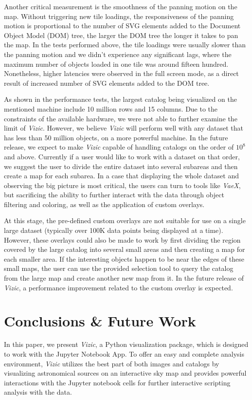 \documentclass[5p,authoryear]{elsarticle}
\begin{document}
Another critical measurement is the smoothness of the panning motion on the map.
Without triggering new tile loadings, the responsiveness of the panning motion is proportional to the number of SVG elements added to the Document Object Model (DOM) tree, the larger the DOM tree the longer it takes to pan the map.
In the tests performed above, the tile loadings were usually slower than the panning motion and we didn't experience any significant lags, where the maximum number of objects loaded in one tile was around fifteen hundred.
Nonetheless, higher latencies were observed in the full screen mode, as a direct result of increased number of SVG elements added to the DOM tree.

As shown in the performance tests, the largest catalog being visualized on the mentioned machine include 10 million rows and 15 columns. Due to the constraints of the available hardware, we were not able to further examine the limit of \textit{Vizic}. However, we believe \textit{Vizic} will perform well with any dataset that has less than 50 million objects, on a more powerful machine. In the future release, we expect to make \textit{Vizic} capable of handling catalogs on the order of  $10^8$ and above. Currently if a user would like to work with a dataset on that order, we suggest the user to divide the entire dataset into several subareas and then create a map for each subarea. In a case that displaying the whole dataset and observing the big picture is most critical, the users can turn to tools like \textit{VaeX}, but sacrificing the ability to further interact with the data through object filtering and coloring, as well as the application of custom overlays.


At this stage, the pre-defined custom overlays are not suitable for use on a single large dataset (typically over 100K data points being displayed at a time).
However, these overlays could also be made to work by first dividing the region covered by the large catalog into several small areas and then creating a map for each smaller area.
If the interesting objects happen to be near the edges of these small maps, the user can use the provided selection tool to query the catalog from the large map and create another new map from it.
In the future release of \textit{Vizic}, a performance improvement related to the custom overlay is expected.

\section{Conclusions \& Future Work}
\label{future}
In this paper, we present \textit{Vizic}, a Python visualization package, which is designed to work with the Jupyter Notebook App.
To offer an easy and complete analysis environment, \textit{Vizic} utilizes the best part of both images and catalogs by visualizing astronomical sources on an interactive sky map and provides powerful interactions with the Jupyter notebook cells for further interactive scripting analysis with the data.
\end{document}
